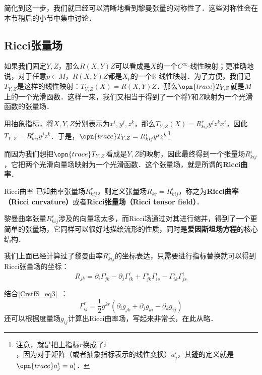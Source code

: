 简化到这一步，我们就已经可以清晰地看到黎曼张量的对称性了．这些对称性会在本节稍后的小节中集中讨论．











\subsection{Ricci张量场}

如果我们固定$Y, Z$，那么$R(X, Y)Z$可以看成是$X$的一个$C^{\infty}$-线性映射；更准确地说，对于任意$p\in M$，$R(X, Y)Z$都是$X_p$的一个$\mathbb{R}$-线性映射．为了方便，我们记$T_{Y, Z}$是这样的线性映射：$T_{Y, Z}(X)=R(X, Y)Z$．那么$\opn{trace}T_{Y, Z}$就是$M$上的一个光滑函数．这样一来，我们又相当于得到了一个将$Y$和$Z$映射为一个光滑函数的张量场．

用抽象指标，将$X, Y, Z$分别表示为$x^i, y^j, z^k$，那么$T_{Y, Z}(X)=R^r_{kij}y^jz^kx^i$，因此$T_{Y, Z}=R^r_{kij}y^jz^k$．于是，$\opn{trace}T_{Y, Z}=R^i_{kij}y^jz^k$\footnote{注意，就是把上指标$r$换成了$i$，因为对于矩阵（或者抽象指标表示的线性变换）$a^i_j$，其\textbf{迹}的定义就是$\opn{trace}a^i_j=a^i_i$．}

而因为我们想把$\opn{trace}T_{Y, Z}$看成是$Y, Z$的映射，因此最终得到一个张量场$R^i_{kij}$，它把两个光滑向量场映射为一个光滑函数．这个张量场，就是所谓的\textbf{Ricci曲率}．

\begin{definition}{Ricci曲率}
已知曲率张量场$R^r_{kij}$，则定义张量场$R_{kj}=R^i_{kij}$，称之为\textbf{Ricci曲率（Ricci curvature）}或者\textbf{Ricci张量场（Ricci tensor field）}．
\end{definition}

黎曼曲率张量$R^r_{kij}$涉及的向量场太多，而Ricci场通过对其进行缩并，得到了一个更简单的张量场，它同样可以很好地描绘流形的性质，同时是\textbf{爱因斯坦场方程}的核心结构．

我们上面已经计算过了黎曼曲率$R^r_{kij}$的坐标表达，只需要进行指标替换就可以得到Ricci张量场的坐标：
\begin{equation}\label{RicciC_eq9}
R_{jk}=\partial_i\Gamma^i_{jk}-\partial_j\Gamma^{i}_{ik}+\Gamma^s_{jk}\Gamma^i_{is}-\Gamma^s_{ik}\Gamma^i_{js}
\end{equation}

结合\autoref{CrstfS_eq3}~：
\begin{equation}
\Gamma^{r}_{ij}=\frac{1}{2}g^{kr}(\partial_ig_{jk}+\partial_jg_{ki}-\partial_kg_{ij})
\end{equation}
还可以根据度量场$g_{ij}$计算出Ricci曲率场，写起来非常长，在此从略．





